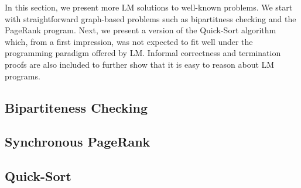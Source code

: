 In this section, we present more LM solutions to well-known problems. We start
with straightforward graph-based problems such as bipartitness checking and the
PageRank program. Next, we present a version of the Quick-Sort algorithm which,
from a first impression, was not expected to fit well under the programming
paradigm offered by LM. Informal correctness and termination proofs are also
included to further show that it is easy to reason about LM programs.

\subsection{Bipartiteness Checking}

\subsection{Synchronous PageRank}\label{section:language:pagerank}

\subsection{Quick-Sort}

